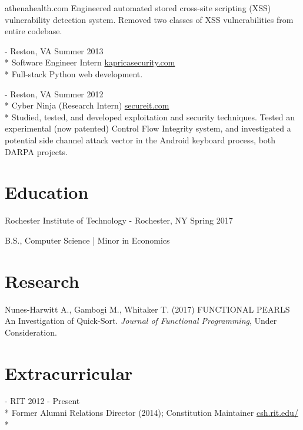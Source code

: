 \documentclass[letter,margin,line]{resume}
\newcommand{\rurl}[1]{\hfill {\footnotesize \url{#1}}}
\newcommand{\rdate}[1]{\hfill {\small #1}}
\renewcommand{\employer}[6]{\item[#1] - #2 \rdate{#3} \\* #4 \rurl{#5}\\* #6}
\begin{document}
\begin{resume}
\begin{asparadesc}
                     {athenahealth.com}
                     {
                         Engineered automated stored cross-site scripting (XSS) vulnerability detection system.
                        Removed two classes of XSS vulnerabilities from entire codebase.
                     }\\
            \employer{Kaprica Security}
                     {Reston, VA}
                     {Summer 2013}
                     {Software Engineer Intern}
                     {kapricasecurity.com}
                     {
                         Full-stack Python web development.
                     }\\
            \employer{SecureIT}
                     {Reston, VA}
                     {Summer 2012}
                     {Cyber Ninja (Research Intern)}
                     {secureit.com}
                     {
                      Studied, tested, and developed exploitation and security techniques.
                      Tested an experimental (now patented)
                      Control Flow Integrity system, and 
                      investigated a potential side channel attack vector
                      in the Android keyboard process, both DARPA projects.
                     }
        \end{asparadesc}

        \section{\mysidestyle Education}
        \begin{compactdesc}
        \item[Rochester Institute of Technology] - Rochester, NY
            \rdate{Spring 2017}
        \item B.S., Computer Science | Minor in Economics
        \end{compactdesc}

        \section{\mysidestyle Research}
        \begin{compactdesc}
        \item Nunes-Harwitt A., Gambogi M., Whitaker T. (2017) FUNCTIONAL PEARLS An Investigation of Quick-Sort.
              \textit{Journal of Functional Programming}, Under Consideration.
        \end{compactdesc}

        \section{\mysidestyle Extracurricular}
        \begin{asparadesc}
            \employer{Computer Science House}
                     {RIT}
                     {2012 - Present}
                     {Former Alumni Relations Director (2014); Constitution Maintainer}
                     {csh.rit.edu/}
                     {}
        \end{asparadesc}


\end{resume}
\end{document}

